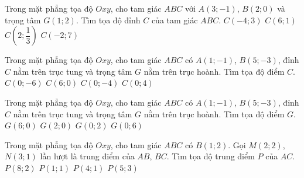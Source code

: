 \begin{ex}%
	Trong mặt phẳng tọa độ $Oxy$, cho tam giác $ABC$ với $A(3;-1)$, $B(2;0)$ và trọng tâm $G(1;2)$. Tìm tọa độ đỉnh $C$ của tam giác $ABC.$
	\choice
	{$C(-4;3)$}
	{$C(6;1)$}
	{$C\left(2;\dfrac{1}{3}\right)$}
	{\True $C(-2;7)$}
\end{ex}

\begin{ex}%
	Trong mặt phẳng tọa độ $Oxy$, cho tam giác $ABC$ có $A(1;-1)$, $B(5;-3)$, đỉnh $C$ nằm trên trục tung và trọng tâm $G$ nằm trên trục hoành. Tìm tọa độ điểm $C$.
	\choice
	{$C(0;-6)$}
	{$C(6;0)$}
	{$C(0;-4)$}
	{\True $C(0;4)$}
\end{ex}

\begin{ex}%
	Trong mặt phẳng tọa độ $Oxy$, cho tam giác $ABC$ có $A(1;-1)$, $B(5;-3)$, đỉnh $C$ nằm trên trục tung và trọng tâm $G$ nằm trên trục hoành. Tìm tọa độ điểm $G$.
	\choice
	{$G(6;0)$}
	{\True $G(2;0)$}
	{$G(0;2)$}
	{$G(0;6)$}
\end{ex}

\begin{ex}%
	Trong mặt phẳng tọa độ $Oxy$, cho tam giác $ABC$ có $B(1;2)$. Gọi $M(2;2)$, $N(3;1)$ lần lượt là trung điểm của $AB$, $BC$. Tìm tọa độ trung điểm $P$ của $AC$.
	\choice
	{$P(8;2)$}
	{$P(1;1)$}
	{\True $P(4;1)$}
	{$P(5;3)$}
\end{ex}

